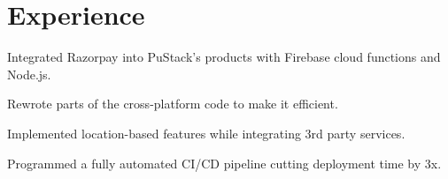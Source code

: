 \documentclass[]{deedy-resume-reversed}
\begin{document}
%
%

%
%

%
%

\begin{minipage}[t]{0.6\textwidth}


\section{Experience}
\vspace{\topsep} %
\begin{tightemize}
\item  Integrated Razorpay into PuStack's products with Firebase cloud functions and Node.js.
\item Rewrote parts of the cross-platform code to make it efficient.
\item Implemented location-based features while integrating 3rd party services.
\item Programmed a fully automated CI/CD pipeline cutting deployment time by 3x.
\end{tightemize}
\sectionsep


\end{minipage}
\end{document}
